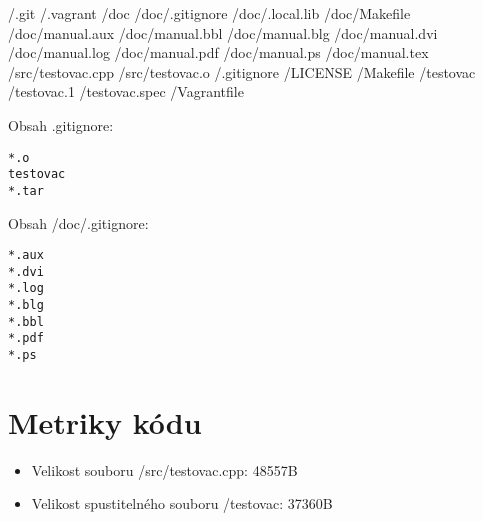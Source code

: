 \documentclass[a4paper,11pt]{article}
\begin{document}
/.git \newline
/.vagrant \newline
/doc \newline
/doc/.gitignore \newline
/doc/.local.lib \newline
/doc/Makefile \newline
/doc/manual.aux \newline
/doc/manual.bbl \newline
/doc/manual.blg \newline
/doc/manual.dvi \newline
/doc/manual.log \newline
/doc/manual.pdf \newline
/doc/manual.ps \newline
/doc/manual.tex \newline
/src/testovac.cpp \newline
/src/testovac.o \newline
/.gitignore \newline
/LICENSE \newline
/Makefile \newline
/testovac \newline
/testovac.1 \newline
/testovac.spec \newline
/Vagrantfile \newline

Obsah .gitignore:

\begin{lstlisting}[frame=single,breaklines]
*.o
testovac
*.tar
\end{lstlisting}

Obsah /doc/.gitignore:

\begin{lstlisting}[frame=single,breaklines]
*.aux
*.dvi
*.log
*.blg
*.bbl
*.pdf
*.ps
\end{lstlisting}

\section*{Metriky kódu}
\begin{itemize}
  \item Velikost souboru /src/testovac.cpp: 48557B
  \item Velikost spustitelného souboru /testovac: 37360B
\end{itemize}
\end{document}

